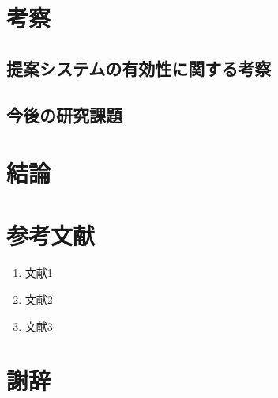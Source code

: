 \documentclass[uplatex,a4j,10pt,titlepage]{jsarticle}
\begin{document}
\section{考察}
\subsection{提案システムの有効性に関する考察}
\subsection{今後の研究課題}

\section{結論}

\section*{参考文献}
\begin{enumerate}
	\item 文献1
	\item 文献2
	\item 文献3
\end{enumerate}

\section*{謝辞}
\end{document}
